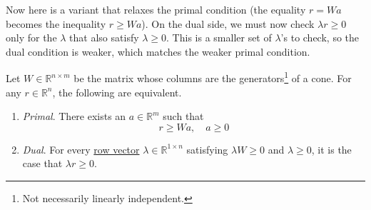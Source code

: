 	Now here is a variant that relaxes the primal condition (the equality $r = Wa$ becomes the inequality $r \geq Wa$). On the dual side, we must now check $\lambda r \geq 0$ only for the $\lambda$ that also satisfy $\lambda \geq 0$. This is a smaller set of $\lambda$'s to check, so the dual condition is weaker, which matches the weaker primal condition. 

	\begin{theorem}
	  \label{thm:farkas-lemma-inequality-form}
		Let $W \in \mathbb{R}^{n \times m}$ be the matrix whose columns are the generators\footnote{Not necessarily linearly independent.} of a cone. For any $r \in \mathbb{R}^n$, the following are equivalent. 
		\begin{enumerate}
			\item \textit{Primal}. There exists an $a \in \mathbb{R}^m$ such that 
				\begin{equation}
				  r \geq Wa, \quad a \geq 0
				\end{equation}

			\item \textit{Dual}. For every \hyperref[lin-def:row-vector]{row vector} $\lambda \in \mathbb{R}^{1 \times n}$ satisfying $\lambda W \geq 0$ and $\lambda \geq 0$, it is the case that $\lambda r \geq 0$. 
		\end{enumerate}
  \end{theorem}
